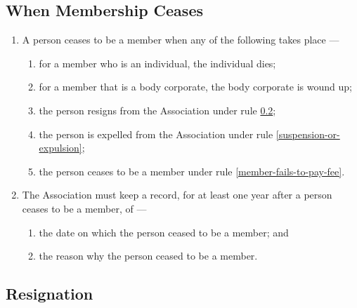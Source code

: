 \documentclass[../constitution.tex]{subfiles}
\begin{document}
\subsection{When Membership Ceases} \label{when-membership-ceases}

\begin{enumerate}

\item A person ceases to be a member when any of the following takes place ---

  \begin{enumerate}
  
  \item for a member who is an individual, the individual dies;
  \item for a member that is a body corporate, the body corporate is wound up;
  \item the person resigns from the Association under rule \ref{resignation};
  \item the person is expelled from the Association under rule \ref{suspension-or-expulsion};
  \item the person ceases to be a member under rule \ref{member-fails-to-pay-fee}.
  \end{enumerate}
\item The Association must keep a record, for at least one year after a person ceases to be a member, of ---

  \begin{enumerate}
  
  \item the date on which the person ceased to be a member; and
  \item the reason why the person ceased to be a member.
  \end{enumerate}
\end{enumerate}


\subsection{Resignation} \label{resignation}
\end{document}
